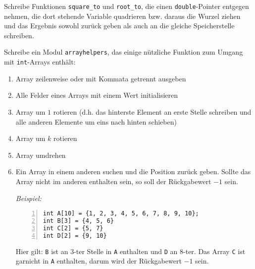 \documentclass{uebungszettel}
\begin{document}
\begin{aufg}
Schreibe Funktionen \verb|square_to| und \verb|root_to|, die einen \verb|double|-Pointer entgegen nehmen, die dort 
stehende Variable quadrieren bzw. daraus die Wurzel ziehen und das Ergebnis sowohl zurück geben als auch an die gleiche 
Speicherstelle schreiben.
\end{aufg}

\begin{aufg}
Schreibe ein Modul \verb|arrayhelpers|, das einige nützliche Funktion zum Umgang mit \verb|int|-Arrays enthält:
\begin{enumerate}
\item Array zeilenweise oder mit Kommata getrennt ausgeben
\item Alle Felder eines Arrays mit einem Wert initialisieren
\item Array um $1$ rotieren (d.h. das hinterste Element an erste Stelle schreiben und alle anderen Elemente um eins nach hinten schieben)
\item Array um $k$ rotieren 
\item Array umdrehen
\item Ein Array in einem anderen suchen und die Position zurück geben. Sollte das Array nicht im anderen enthalten sein, so soll der Rückgabewert $-1$ sein.

\emph{Beispiel:} 
\begin{codelisting}
\begin{lstlisting}[numbers=left,numberstyle=\tiny,frame=tlrb]
int A[10] = {1, 2, 3, 4, 5, 6, 7, 8, 9, 10};
int B[3] = {4, 5, 6}
int C[2] = {5, 7}
int D[2] = {9, 10}
\end{lstlisting}
\end{codelisting}
Hier gilt: \verb|B| ist an $3$-ter Stelle in \verb|A| enthalten und \verb|D| an $8$-ter. Das Array \verb|C| ist garnicht in \verb|A| enthalten, darum wird der Rückgabewert $-1$ sein.
\end{enumerate}
\end{aufg}
    
\end{document}

